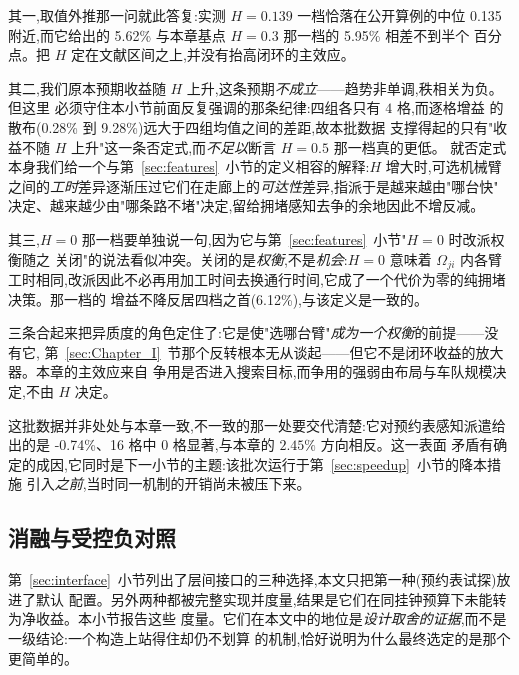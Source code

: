 \documentclass[manuscript,screen,review]{acmart}
\newcommand{\GainProbeLoop}{2.45\%}      %
\newcommand{\MatrixCells}{16}
\newcommand{\GainIntegMatrixLo}{0.28\%}
\newcommand{\GainIntegMatrixHi}{9.28\%}
\newcommand{\GainProbePre}{-0.74\%}      %
\newcommand{\GainIntegHZero}{6.12\%}
\newcommand{\GainIntegHLow}{5.62\%}      %
\newcommand{\GainIntegHMid}{5.95\%}      %
\newcommand{\MatrixHMeasLow}{0.139}      %
\newcommand{\PubHMed}{0.135}             %
\begin{document}
其一,取值外推那一问就此答复:实测 $H=\MatrixHMeasLow$ 一档恰落在公开算例的中位 \PubHMed{}
附近,而它给出的 \GainIntegHLow{} 与本章基点 $H=0.3$ 那一档的 \GainIntegHMid{} 相差不到半个
百分点。把 $H$ 定在文献区间之上,并没有抬高闭环的主效应。

其二,我们原本预期收益随 $H$ 上升,这条预期\emph{不成立}——趋势非单调,秩相关为负。但这里
必须守住本小节前面反复强调的那条纪律:四组各只有 $4$ 格,而逐格增益
的散布(\GainIntegMatrixLo{} 到 \GainIntegMatrixHi{})远大于四组均值之间的差距,故本批数据
支撑得起的只有"收益不随 $H$ 上升"这一条否定式,而\emph{不足以}断言 $H=0.5$ 那一档真的更低。
就否定式本身我们给一个与第~\ref{sec:features}~小节的定义相容的解释:$H$ 增大时,可选机械臂
之间的\emph{工时}差异逐渐压过它们在走廊上的\emph{可达性}差异,指派于是越来越由"哪台快"
决定、越来越少由"哪条路不堵"决定,留给拥堵感知去争的余地因此不增反减。

其三,$H=0$ 那一档要单独说一句,因为它与第~\ref{sec:features}~小节"$H=0$ 时改派权衡随之
关闭"的说法看似冲突。关闭的是\emph{权衡},不是\emph{机会}:$H=0$ 意味着 $\Omega_{ji}$ 内各臂
工时相同,改派因此不必再用加工时间去换通行时间,它成了一个代价为零的纯拥堵决策。那一档的
增益不降反居四档之首(\GainIntegHZero{}),与该定义是一致的。

三条合起来把异质度的角色定住了:它是使"选哪台臂"\emph{成为一个权衡}的前提——没有它,
第~\ref{sec:Chapter_I}~节那个反转根本无从谈起——但它不是闭环收益的放大器。本章的主效应来自
争用是否进入搜索目标,而争用的强弱由布局与车队规模决定,不由 $H$ 决定。

这批数据并非处处与本章一致,不一致的那一处要交代清楚:它对预约表感知派遣给出的是
\GainProbePre{}、\MatrixCells{} 格中 $0$ 格显著,与本章的 $\GainProbeLoop$ 方向相反。这一表面
矛盾有确定的成因,它同时是下一小节的主题:该批次运行于第~\ref{sec:speedup}~小节的降本措施
引入\emph{之前},当时同一机制的开销尚未被压下来。

\subsection{消融与受控负对照}
\label{sec:pricing}

第~\ref{sec:interface}~小节列出了层间接口的三种选择,本文只把第一种(预约表试探)放进了默认
配置。另外两种都被完整实现并度量,结果是它们在同挂钟预算下未能转为净收益。本小节报告这些
度量。它们在本文中的地位是\emph{设计取舍的证据},而不是一级结论:一个构造上站得住却仍不划算
的机制,恰好说明为什么最终选定的是那个更简单的。
\end{document}
